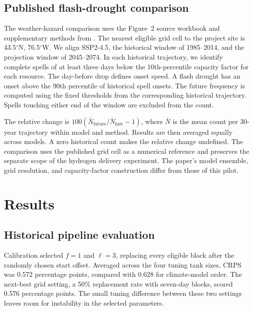 \subsection{Published flash-drought comparison}
The weather-hazard comparison uses the Figure~2 source workbook and supplementary methods from \citet{lin2026}. The nearest eligible grid cell to the project site is 43.5$^{\circ}$N, 76.5$^{\circ}$W. We align SSP2-4.5, the historical window of 1985--2014, and the projection window of 2045--2074. In each historical trajectory, we identify complete spells of at least three days below the 10th-percentile capacity factor for each resource. The day-before drop defines onset speed. A flash drought has an onset above the 90th percentile of historical spell onsets. The future frequency is computed using the fixed thresholds from the corresponding historical trajectory. Spells touching either end of the window are excluded from the count.

The relative change is $100(\bar N_{\mathrm{future}}/\bar N_{\mathrm{hist}}-1)$, where $\bar N$ is the mean count per 30-year trajectory within model and method. Results are then averaged equally across models. A zero historical count makes the relative change undefined. The comparison uses the published grid cell as a numerical reference and preserves the separate scope of the hydrogen delivery experiment. The paper's model ensemble, grid resolution, and capacity-factor construction differ from those of this pilot.

\section{Results}
\label{sec:results}

\subsection{Historical pipeline evaluation}
Calibration selected $f=1$ and $\ell=3$, replacing every eligible block after the randomly chosen start offset. Averaged across the four tuning tank sizes, CRPS was 0.572 percentage points, compared with 0.628 for climate-model order. The next-best grid setting, a 50\% replacement rate with seven-day blocks, scored 0.576 percentage points. The small tuning difference between these two settings leaves room for instability in the selected parameters.

